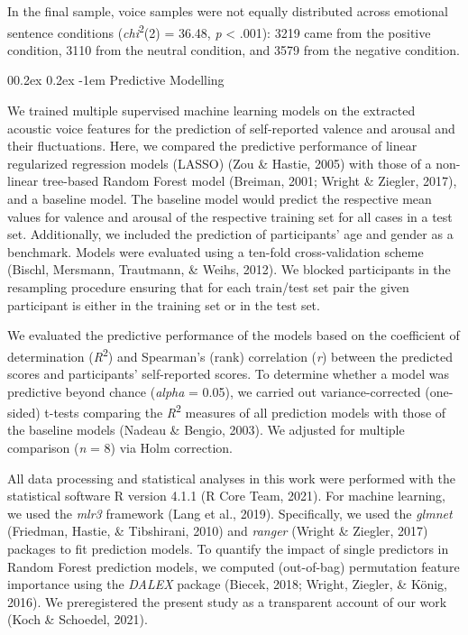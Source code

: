 \documentclass[
  man,floatsintext]{apa6}
\makeatletter
\let\oldparagraph\paragraph
\renewcommand{\paragraph}[1]{\oldparagraph{#1}\mbox{}}
\renewcommand{\paragraph}{\@startsection{paragraph}{4}{\parindent}%
  {0\baselineskip \@plus 0.2ex \@minus 0.2ex}%
  {-1em}%
  {\normalfont\normalsize\bfseries\itshape\typesectitle}}
\makeatother
\begin{document}
In the final sample, voice samples were not equally distributed across emotional sentence conditions (\emph{chi}\textsuperscript{2}(2) = 36.48, \emph{p} \textless{} .001): 3219 came from the positive condition, 3110 from the neutral condition, and 3579 from the negative condition.

\hypertarget{predictive-modelling}{%
\paragraph{Predictive Modelling}\label{predictive-modelling}}

We trained multiple supervised machine learning models on the extracted acoustic voice features for the prediction of self-reported valence and arousal and their fluctuations. Here, we compared the predictive performance of linear regularized regression models (LASSO) (Zou \& Hastie, 2005) with those of a non-linear tree-based Random Forest model (Breiman, 2001; Wright \& Ziegler, 2017), and a baseline model. The baseline model would predict the respective mean values for valence and arousal of the respective training set for all cases in a test set. Additionally, we included the prediction of participants' age and gender as a benchmark. Models were evaluated using a ten-fold cross-validation scheme (Bischl, Mersmann, Trautmann, \& Weihs, 2012). We blocked participants in the resampling procedure ensuring that for each train/test set pair the given participant is either in the training set or in the test set.

We evaluated the predictive performance of the models based on the coefficient of determination (\emph{R}\textsuperscript{2}) and Spearman's (rank) correlation (\emph{r}) between the predicted scores and participants' self-reported scores. To determine whether a model was predictive beyond chance (\emph{alpha} = 0.05), we carried out variance-corrected (one-sided) t-tests comparing the \emph{R}\textsuperscript{2} measures of all prediction models with those of the baseline models (Nadeau \& Bengio, 2003). We adjusted for multiple comparison (\emph{n} = 8) via Holm correction.

All data processing and statistical analyses in this work were performed with the statistical software R version 4.1.1 (R Core Team, 2021). For machine learning, we used the \emph{mlr3} framework (Lang et al., 2019). Specifically, we used the \emph{glmnet} (Friedman, Hastie, \& Tibshirani, 2010) and \emph{ranger} (Wright \& Ziegler, 2017) packages to fit prediction models. To quantify the impact of single predictors in Random Forest prediction models, we computed (out-of-bag) permutation feature importance using the \emph{DALEX} package (Biecek, 2018; Wright, Ziegler, \& König, 2016). We preregistered the present study as a transparent account of our work (Koch \& Schoedel, 2021).
\end{document}
